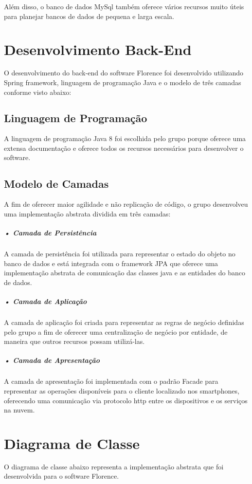 \documentclass[portuguese,oneside]{tcc}
\begin{document}
Além disso, o banco de dados MySql também oferece vários recursos muito úteis para planejar bancos de dados de pequena e larga escala. %

\section{Desenvolvimento Back-End}
O desenvolvimento do back-end do software Florence foi desenvolvido utilizando Spring framework, linguagem de programação Java e o modelo de três camadas conforme visto abaixo:

\subsection{Linguagem de Programação}
A linguagem de programação Java 8 foi escolhida pelo grupo porque oferece uma extensa documentação e oferece todos os recursos necessários para desenvolver o software.

\subsection{Modelo de Camadas}
A fim de oferecer maior agilidade e não replicação de código, o grupo desenvolveu uma implementação abstrata dividida em três camadas:

\subparagraph{• Camada de Persistência}
A camada de persistência foi utilizada para representar o estado do objeto no banco de dados e está integrada com o framework JPA que oferece uma implementação abstrata de comunicação das classes java e as entidades do banco de dados.

\subparagraph{• Camada de Aplicação}
A camada de aplicação foi criada para representar as regras de negócio definidas pelo grupo a fim de oferecer uma centralização de negócio por entidade, de maneira que outros recursos possam utilizá-las.


\subparagraph{• Camada de Apresentação}
A camada de apresentação foi implementada com o padrão Facade para representar as operações disponíveis para o cliente localizado nos smartphones, oferecendo uma comunicação via protocolo http entre os dispositivos e os serviços na nuvem.

\newpage

\section{Diagrama de Classe}
O diagrama de classe abaixo representa a implementação abstrata que foi desenvolvida para o software Florence.
\end{document}
